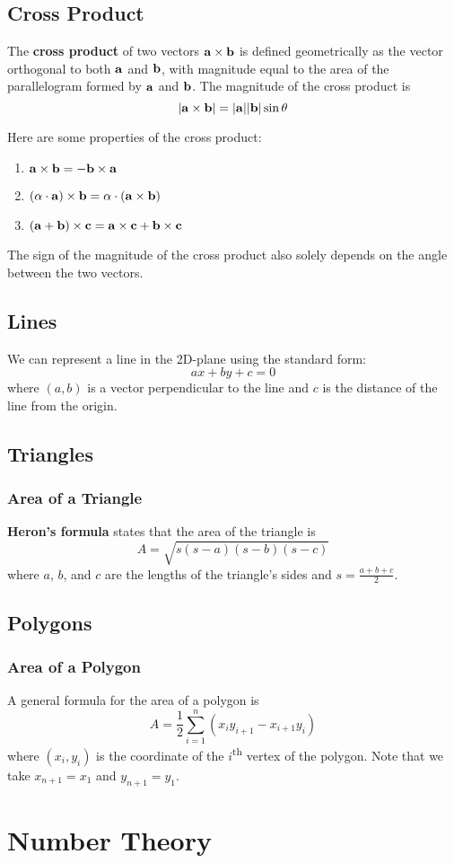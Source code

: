 \documentclass{article}
\begin{document}
\subsection{Cross Product}

The \textbf{cross product} of two vectors $\vb{a} \times \vb{b}$ is defined geometrically as the vector orthogonal to both $\vb{a}$ and $\vb{b}$, with magnitude equal to the area of the parallelogram formed by $\vb{a}$ and $\vb{b}$. The magnitude of the cross product is
$$
|\vb{a} \times \vb{b}| = |\vb{a}||\vb{b}|\sin{\theta}
$$

Here are some properties of the cross product:
\begin{enumerate}
  \item $\vb{a} \times \vb{b} = -\vb{b} \times \vb{a}$
  \item $(\alpha \cdot \vb{a}) \times \vb{b} = \alpha \cdot (\vb{a} \times \vb{b})$
  \item $(\vb{a} + \vb{b}) \times \vb{c} = \vb{a} \times \vb{c} + \vb{b} \times \vb{c}$
\end{enumerate}

The sign of the magnitude of the cross product also solely depends on the angle between the two vectors.

\subsection{Lines}

We can represent a line in the 2D-plane using the standard form:
$$
ax + by + c = 0
$$
where $(a, b)$ is a vector perpendicular to the line and $c$ is the distance of the line from the origin.

\subsection{Triangles}

\subsubsection{Area of a Triangle}

\textbf{Heron's formula} states that the area of the triangle is
$$
A = \sqrt{s(s-a)(s-b)(s-c)}
$$
where $a$, $b$, and $c$ are the lengths of the triangle's sides and $s = \frac{a+b+c}{2}$.

\subsection{Polygons}

\subsubsection{Area of a Polygon}

A general formula for the area of a polygon is
$$
A = \frac{1}{2} \sum\limits_{i=1}^n (x_i y_{i+1} - x_{i+1} y_i)
$$
where $(x_i, y_i)$ is the coordinate of the $i$\textsuperscript{th} vertex of the polygon. Note that we take $x_{n+1} = x_1$ and $y_{n+1} = y_1$.

\section{Number Theory}
\end{document}
